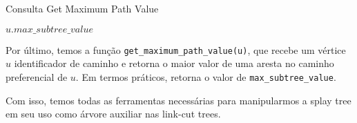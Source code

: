 \begin{algorithm}[h!]
    \caption{Consulta Get Maximum Path Value}\label{splay:get-maximum-value}
    \begin{algorithmic}
        \State \Return $u.max\_subtree\_value$
        \EndFunction
    \end{algorithmic}
\end{algorithm}

Por último, temos a função \texttt{get\_maximum\_path\_value(u)}, que recebe um vértice $u$ identificador de caminho e retorna o maior valor de uma aresta no caminho preferencial de $u$. Em termos práticos, retorna o valor de \texttt{max\_subtree\_value}.

Com isso, temos todas as ferramentas necessárias para manipularmos a splay tree em seu uso como árvore auxiliar nas link-cut trees.